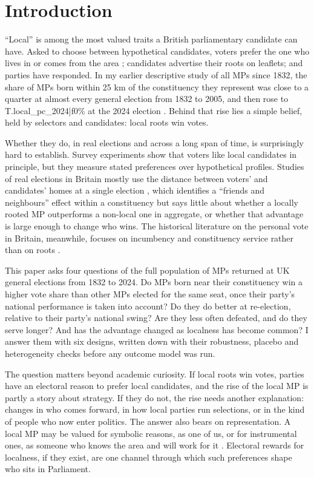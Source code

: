 \documentclass[11pt,a4paper]{article}
\begin{document}
\section{Introduction}
``Local'' is among the most valued traits a British parliamentary candidate can have. Asked to choose between hypothetical candidates, voters prefer the one who lives in or comes from the area \citep{campbellcowley2014,campbell2019}; candidates advertise their roots on leaflets; and parties have responded. In my earlier descriptive study of all MPs since 1832, the share of MPs born within 25 km of the constituency they represent was close to a quarter at almost every general election from 1832 to 2005, and then rose to {{T.local_pc_2024|f0}}\% at the 2024 election \citep{hotham2026mpl}. Behind that rise lies a simple belief, held by selectors and candidates: local roots win votes.

Whether they do, in real elections and across a long span of time, is surprisingly hard to establish. Survey experiments show that voters like local candidates in principle, but they measure stated preferences over hypothetical profiles. Studies of real elections in Britain mostly use the distance between voters' and candidates' homes at a single election \citep{arzheimerevans2012,arzheimerevans2014,evans2017}, which identifies a ``friends and neighbours'' effect within a constituency but says little about whether a locally rooted MP outperforms a non-local one in aggregate, or whether that advantage is large enough to change who wins. The historical literature on the personal vote in Britain, meanwhile, focuses on incumbency and constituency service rather than on roots \citep{cain1987,gaines1998,eggersspirling2017}.

This paper asks four questions of the full population of MPs returned at UK general elections from 1832 to 2024. Do MPs born near their constituency win a higher vote share than other MPs elected for the same seat, once their party's national performance is taken into account? Do they do better at re-election, relative to their party's national swing? Are they less often defeated, and do they serve longer? And has the advantage changed as localness has become common? I answer them with six designs, written down with their robustness, placebo and heterogeneity checks before any outcome model was run.

The question matters beyond academic curiosity. If local roots win votes, parties have an electoral reason to prefer local candidates, and the rise of the local MP is partly a story about strategy. If they do not, the rise needs another explanation: changes in who comes forward, in how local parties run selections, or in the kind of people who now enter politics. The answer also bears on representation. A local MP may be valued for symbolic reasons, as one of us, or for instrumental ones, as someone who knows the area and will work for it \citep{childscowley2011,campbell2019}. Electoral rewards for localness, if they exist, are one channel through which such preferences shape who sits in Parliament.
\end{document}
